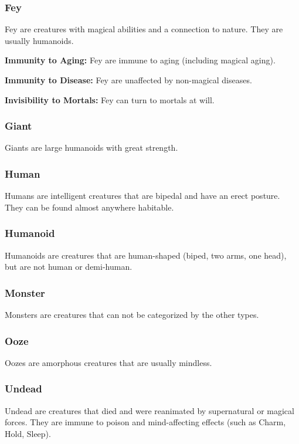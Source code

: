 \begin{multicols*}{2}
\subsubsection{Fey}
Fey are creatures with magical abilities and a connection to nature. They are usually humanoids.

\textbf{Immunity to Aging:} Fey are immune to aging (including magical aging).

\textbf{Immunity to Disease:} Fey are unaffected by non-magical diseases.

\textbf{Invisibility to Mortals:} Fey can turn  to mortals at will.

\subsubsection{Giant}
Giants are large humanoids with great strength.

\subsubsection{Human}
Humans are intelligent creatures that are bipedal and have an erect posture. They can be found almost anywhere habitable.

\subsubsection{Humanoid}
Humanoids are creatures that are human-shaped (biped, two arms, one head), but are not human or demi-human.

\subsubsection{Monster}
Monsters are creatures that can not be categorized by the other types.

\subsubsection{Ooze}
Oozes are amorphous creatures that are usually mindless.

\subsubsection{Undead}
Undead are creatures that died and were reanimated by supernatural or magical forces. They are immune to poison and mind-affecting effects (such as Charm, Hold, Sleep).


\end{multicols*}
